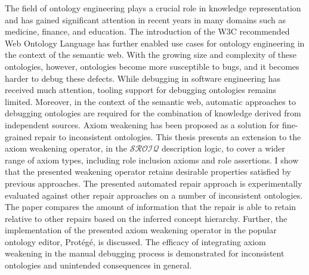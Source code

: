 The field of ontology engineering plays a crucial role in knowledge representation and has gained significant attention in recent years in many domains such as medicine, finance, and education. The introduction of the W3C recommended Web Ontology Language has further enabled use cases for ontology engineering in the context of the semantic web. With the growing size and complexity of these ontologies, however, ontologies become more susceptible to bugs, and it becomes harder to debug these defects. While debugging in software engineering has received much attention, tooling support for debugging ontologies remains limited. Moreover, in the context of the semantic web, automatic approaches to debugging ontologies are required for the combination of knowledge derived from independent sources. Axiom weakening has been proposed as a solution for fine-grained repair to inconsistent ontologies. This thesis presents an extension to the axiom weakening operator, in the $\mathcal{SROIQ}$ description logic, to cover a wider range of axiom types, including role inclusion axioms and role assertions. I show that the presented weakening operator retains desirable properties satisfied by previous approaches. The presented automated repair approach is experimentally evaluated against other repair approaches on a number of inconsistent ontologies. The paper compares the amount of information that the repair is able to retain relative to other repairs based on the inferred concept hierarchy. Further, the implementation of the presented axiom weakening operator in the popular ontology editor, Protégé, is discussed. The efficacy of integrating axiom weakening in the manual debugging process is demonstrated for inconsistent ontologies and unintended consequences in general.

